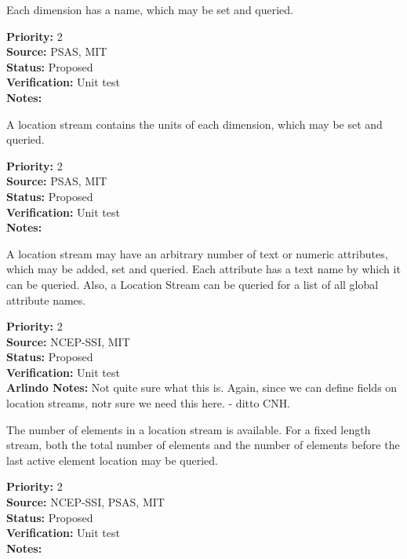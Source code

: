Each dimension has a name, which may be set and queried.
\begin{reqlist}
{\bf Priority:} 2 \\
{\bf Source:} PSAS, MIT\\
{\bf Status:} Proposed \\
{\bf Verification:} Unit test \\
{\bf Notes:} 
\end{reqlist}

A location stream contains the units of each dimension, which may be set and queried.
\begin{reqlist}
{\bf Priority:} 2 \\
{\bf Source:} PSAS, MIT\\
{\bf Status:} Proposed \\
{\bf Verification:} Unit test \\
{\bf Notes:} 
\end{reqlist}


A location stream may have an arbitrary number of text or numeric attributes,
which may be added, set and queried.  Each attribute has a text name by which it
can be queried.  Also, a Location Stream can be queried for a list of all global
attribute names.

\begin{reqlist}
{\bf Priority:} 2 \\
{\bf Source:} NCEP-SSI, MIT \\
{\bf Status:} Proposed \\
{\bf Verification:} Unit test \\
{\bf Arlindo Notes:} Not quite sure what this is. Again, since we can define fields on location streams, notr sure we need this here. 
- ditto CNH.
\end{reqlist}

The number of elements in a location stream is available.  For a fixed length stream,
both the total number of elements and the number of elements before the last
active element location may be queried.
\begin{reqlist}
{\bf Priority:} 2 \\
{\bf Source:} NCEP-SSI, PSAS, MIT\\
{\bf Status:} Proposed \\
{\bf Verification:} Unit test \\
{\bf Notes:} 
\end{reqlist}

